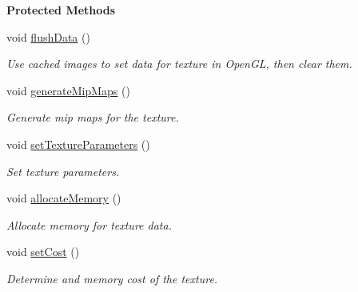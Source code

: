 \begin{Indent}\textbf{ Protected Methods}\par
\begin{DoxyCompactItemize}
\item 
void \mbox{\hyperlink{classrev_1_1_texture_a3962635c50e3180fe611e2890f6ab0f7}{flush\+Data}} ()
\begin{DoxyCompactList}\small\item\em Use cached images to set data for texture in Open\+GL, then clear them. \end{DoxyCompactList}\item 
\mbox{\label{classrev_1_1_texture_af8556538ab8cb513f9bc8340b54dcacf}} 
void \mbox{\hyperlink{classrev_1_1_texture_af8556538ab8cb513f9bc8340b54dcacf}{generate\+Mip\+Maps}} ()
\begin{DoxyCompactList}\small\item\em Generate mip maps for the texture. \end{DoxyCompactList}\item 
\mbox{\label{classrev_1_1_texture_a9514623146b391c499192a5a157fe8f0}} 
void \mbox{\hyperlink{classrev_1_1_texture_a9514623146b391c499192a5a157fe8f0}{set\+Texture\+Parameters}} ()
\begin{DoxyCompactList}\small\item\em Set texture parameters. \end{DoxyCompactList}\item 
\mbox{\label{classrev_1_1_texture_a318f55a46c9642ae4bd56511871ad953}} 
void \mbox{\hyperlink{classrev_1_1_texture_a318f55a46c9642ae4bd56511871ad953}{allocate\+Memory}} ()
\begin{DoxyCompactList}\small\item\em Allocate memory for texture data. \end{DoxyCompactList}\item 
\mbox{\label{classrev_1_1_texture_ab190ce0cda8c731224857f12e371e014}} 
void \mbox{\hyperlink{classrev_1_1_texture_ab190ce0cda8c731224857f12e371e014}{set\+Cost}} ()
\begin{DoxyCompactList}\small\item\em Determine and memory cost of the texture. \end{DoxyCompactList}\item 

\end{DoxyCompactItemize}
\end{Indent}
